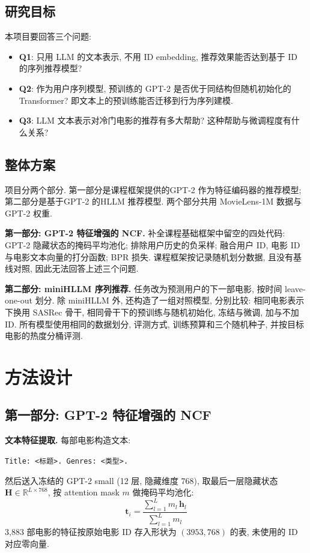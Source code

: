 \documentclass{article}
\begin{document}
\subsection{研究目标}

本项目要回答三个问题:
\begin{itemize}
  \item \textbf{Q1}: 只用 LLM 的文本表示, 不用 ID embedding, 推荐效果能否达到基于 ID 的序列推荐模型?
  \item \textbf{Q2}: 作为用户序列模型, 预训练的 GPT-2 是否优于同结构但随机初始化的 Transformer? 即文本上的预训练能否迁移到行为序列建模.
  \item \textbf{Q3}: LLM 文本表示对冷门电影的推荐有多大帮助? 这种帮助与微调程度有什么关系?
\end{itemize}

\subsection{整体方案}

项目分两个部分. 第一部分是课程框架提供的GPT-2 作为特征编码器的推荐模型; 第二部分是基于GPT-2 的HLLM 推荐模型. 两个部分共用 MovieLens-1M 数据与 GPT-2 权重.

\textbf{第一部分: GPT-2 特征增强的 NCF.} 补全课程基础框架中留空的四处代码: GPT-2 隐藏状态的掩码平均池化; 排除用户历史的负采样; 融合用户 ID, 电影 ID 与电影文本向量的打分函数; BPR 损失. 课程框架按记录随机划分数据, 且没有基线对照, 因此无法回答上述三个问题.

\textbf{第二部分: miniHLLM 序列推荐.} 任务改为预测用户的下一部电影, 按时间 leave-one-out 划分. 除 miniHLLM 外, 还构造了一组对照模型, 分别比较: 相同电影表示下换用 SASRec 骨干, 相同骨干下的预训练与随机初始化, 冻结与微调, 加与不加 ID. 所有模型使用相同的数据划分, 评测方式, 训练预算和三个随机种子, 并按目标电影的热度分桶评测.

\section{方法设计}

\subsection{第一部分: GPT-2 特征增强的 NCF}

\textbf{文本特征提取.} 每部电影构造文本:
\begin{center}
    \texttt{Title: <标题>. Genres: <类型>.}
\end{center}
然后送入冻结的 GPT-2 small (12 层, 隐藏维度 768), 取最后一层隐藏状态 $\mathbf{H}\in\mathbb{R}^{L\times 768}$, 按 attention mask $m$ 做掩码平均池化:
\[
\mathbf{t}_i = \frac{\sum_{l=1}^{L} m_{l}\,\mathbf{h}_{l}}{\sum_{l=1}^{L} m_{l}}
\]
3,883 部电影的特征按原始电影 ID 存入形状为 $(3953, 768)$ 的表, 未使用的 ID 对应零向量.
\end{document}
